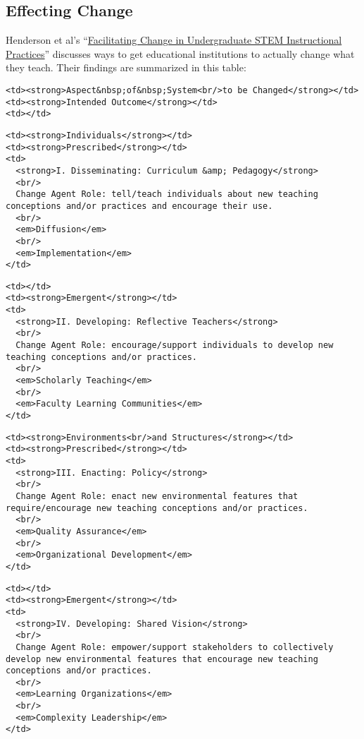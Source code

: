 \subsection{Effecting Change}\label{effecting-change}

Henderson et al's
``\href{\{\{\%20page.root\%20\}\}/files/papers/henderson-facilitating-stem-teaching-change-2011.pdf}{Facilitating
Change in Undergraduate STEM Instructional Practices}'' discusses ways
to get educational institutions to actually change what they teach.
Their findings are summarized in this table:

\begin{verbatim}
<td><strong>Aspect&nbsp;of&nbsp;System<br/>to be Changed</strong></td>
<td><strong>Intended Outcome</strong></td>
<td></td>
\end{verbatim}

\begin{verbatim}
<td><strong>Individuals</strong></td>
<td><strong>Prescribed</strong></td>
<td>
  <strong>I. Disseminating: Curriculum &amp; Pedagogy</strong>
  <br/>
  Change Agent Role: tell/teach individuals about new teaching conceptions and/or practices and encourage their use.
  <br/>
  <em>Diffusion</em>
  <br/>
  <em>Implementation</em>
</td>
\end{verbatim}

\begin{verbatim}
<td></td>
<td><strong>Emergent</strong></td>
<td>
  <strong>II. Developing: Reflective Teachers</strong>
  <br/>
  Change Agent Role: encourage/support individuals to develop new teaching conceptions and/or practices.
  <br/>
  <em>Scholarly Teaching</em>
  <br/>
  <em>Faculty Learning Communities</em>
</td>
\end{verbatim}

\begin{verbatim}
<td><strong>Environments<br/>and Structures</strong></td>
<td><strong>Prescribed</strong></td>
<td>
  <strong>III. Enacting: Policy</strong>
  <br/>
  Change Agent Role: enact new environmental features that require/encourage new teaching conceptions and/or practices.
  <br/>
  <em>Quality Assurance</em>
  <br/>
  <em>Organizational Development</em>
</td>
\end{verbatim}

\begin{verbatim}
<td></td>
<td><strong>Emergent</strong></td>
<td>
  <strong>IV. Developing: Shared Vision</strong>
  <br/>
  Change Agent Role: empower/support stakeholders to collectively develop new environmental features that encourage new teaching conceptions and/or practices.
  <br/>
  <em>Learning Organizations</em>
  <br/>
  <em>Complexity Leadership</em>
</td>
\end{verbatim}

